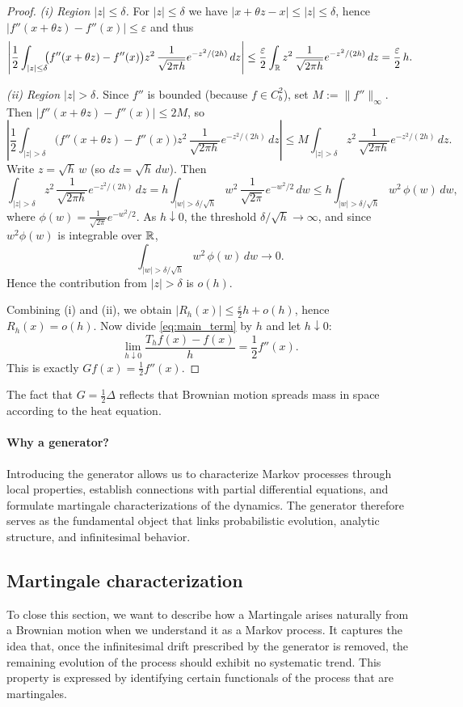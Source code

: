 \begin{proof}
\emph{(i) Region $|z|\le\delta$.}
For $|z|\le\delta$ we have $|x+\theta z-x|\le |z|\le\delta$, hence
$|f''(x+\theta z)-f''(x)|\le\varepsilon$ and thus
\[
\left|\frac12\int_{|z|\le\delta}\!\!\bigl(f''(x+\theta z)-f''(x)\bigr)z^2\,
\frac{1}{\sqrt{2\pi h}}e^{-z^2/(2h)}\,dz\right|
\le \frac{\varepsilon}{2}\int_{\mathbb{R}} z^2\,\frac{1}{\sqrt{2\pi h}}e^{-z^2/(2h)}\,dz
=\frac{\varepsilon}{2}\,h.
\]

\emph{(ii) Region $|z|>\delta$.}
Since $f''$ is bounded (because $f\in C_b^2$), set $M:=\|f''\|_\infty$.
Then $|f''(x+\theta z)-f''(x)|\le 2M$, so
\[
\left|\frac12\int_{|z|>\delta}\!\!\bigl(f''(x+\theta z)-f''(x)\bigr)z^2\,
\frac{1}{\sqrt{2\pi h}}e^{-z^2/(2h)}\,dz\right|
\le
M\int_{|z|>\delta} z^2\,\frac{1}{\sqrt{2\pi h}}e^{-z^2/(2h)}\,dz.
\]
Write $z=\sqrt{h}\,w$ (so $dz=\sqrt{h}\,dw$). Then
\[
\int_{|z|>\delta} z^2\,\frac{1}{\sqrt{2\pi h}}e^{-z^2/(2h)}\,dz
=
h \int_{|w|>\delta/\sqrt{h}} w^2\,\frac{1}{\sqrt{2\pi}}e^{-w^2/2}\,dw
\le
h \int_{|w|>\delta/\sqrt{h}} w^2\,\phi(w)\,dw,
\]
where $\phi(w)=\frac{1}{\sqrt{2\pi}}e^{-w^2/2}$. As $h\downarrow0$, the threshold
$\delta/\sqrt{h}\to\infty$, and since $w^2\phi(w)$ is integrable over $\mathbb{R}$,
\[
\int_{|w|>\delta/\sqrt{h}} w^2\,\phi(w)\,dw \longrightarrow 0.
\]
Hence the contribution from $|z|>\delta$ is $o(h)$.

Combining (i) and (ii), we obtain $|R_h(x)|\le \frac{\varepsilon}{2}h + o(h)$, hence $R_h(x)=o(h)$.
Now divide \eqref{eq:main_term} by $h$ and let $h\downarrow0$:
\[
\lim_{h\downarrow0}\frac{T_h f(x)-f(x)}{h}
=
\frac12 f''(x).
\]
This is exactly $Gf(x)=\frac12 f''(x)$.
\end{proof}

\begin{remark}
    The fact that $G=\tfrac12\Delta$ reflects that Brownian motion spreads mass in space according to the heat equation.
\end{remark}

\paragraph{Why a generator?} Introducing the generator allows us to characterize Markov processes through local
properties, establish connections with partial differential equations, and formulate
martingale characterizations of the dynamics. The generator therefore serves as the
fundamental object that links probabilistic evolution, analytic structure, and
infinitesimal behavior.

\subsection{Martingale characterization}
To close this section, we want to describe how a Martingale arises naturally from a Brownian motion when we understand it as a Markov process. It captures the idea that, once
the infinitesimal drift prescribed by the generator is removed, the remaining evolution of
the process should exhibit no systematic trend. This property is expressed by identifying
certain functionals of the process that are martingales.

